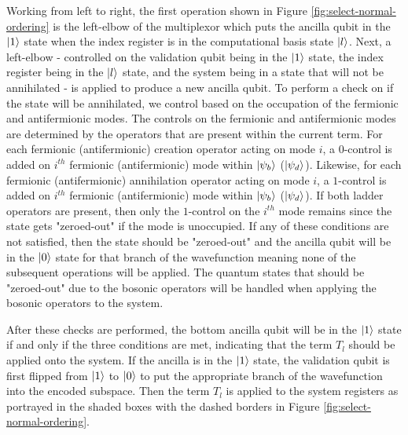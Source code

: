 Working from left to right, the first operation shown in Figure \ref{fig:select-normal-ordering} is the left-elbow of the multiplexor which puts the ancilla qubit in the $\ket{1}$ state when the index register is in the computational basis state $\ket{l}$.
Next, a left-elbow - controlled on the validation qubit being in the $\ket{1}$ state, the index register being in the $\ket{l}$ state, and the system being in a state that will not be annihilated - is applied to produce a new ancilla qubit.
To perform a check on if the state will be annihilated, we control based on the occupation of the fermionic and antifermionic modes.
The controls on the fermionic and antifermionic modes are determined by the operators that are present within the current term.
For each fermionic (antifermionic) creation operator acting on mode $i$, a $0$-control is added on $i^{th}$ fermionic (antifermionic) mode within $\ket{\psi_b}$ ($\ket{\psi_d}$).
Likewise, for each fermionic (antifermionic) annihilation operator acting on mode $i$, a $1$-control is added on $i^{th}$ fermionic (antifermionic) mode within $\ket{\psi_b}$ ($\ket{\psi_d}$).
If both ladder operators are present, then only the $1$-control on the $i^{th}$ mode remains since the state gets "zeroed-out" if the mode is unoccupied.
If any of these conditions are not satisfied, then the state should be "zeroed-out" and the ancilla qubit will be in the $\ket{0}$ state for that branch of the wavefunction meaning none of the subsequent operations will be applied.
The quantum states that should be "zeroed-out" due to the bosonic operators will be handled when applying the bosonic operators to the system.

After these checks are performed, the bottom ancilla qubit will be in the $\ket{1}$ state if and only if the three conditions are met, indicating that the term $T_l$ should be applied onto the system.
If the ancilla is in the $\ket{1}$ state, the validation qubit is first flipped from $\ket{1}$ to $\ket{0}$ to put the appropriate branch of the wavefunction into the encoded subspace.
Then the term $T_l$ is applied to the system registers as portrayed in the shaded boxes with the dashed borders in Figure \ref{fig:select-normal-ordering}.

